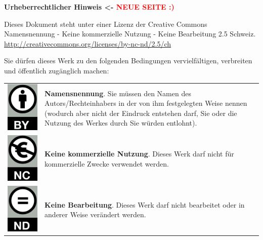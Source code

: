 \documentclass[11pt, twoside, a4paper]{book}		%
\begin{document}
\begin{titlepage}
	\clearpage
	\pagestyle{empty}
	\centering
	
	\textbf{Urheberrechtlicher Hinweis <- \textcolor{red}{NEUE SEITE :)}}

	\hspace{1cm}

	Dieses Dokument steht unter einer Lizenz der Creative Commons Namensnennung - Keine kommerzielle Nutzung - Keine Bearbeitung 2.5 Schweiz.\\ \url{http://creativecommons.org/licenses/by-nc-nd/2.5/ch}
	
	\hspace{1cm}

	\RaggedRight Sie dürfen dieses Werk zu den folgenden Bedingungen vervielfältigen, verbreiten und öffentlich zugänglich machen:

	\begin{table}[h]
		\centering
		\small
		\begin{tabular}{c m{}}
			\raisebox{-.47\height} 	{\includegraphics[width=.1\textwidth]{png/CC_by_me}}
			&
			\textbf{Namensnennung}. Sie müssen den Namen des Autors/Rechteinhabers in der von ihm festgelegten Weise nennen (wodurch aber nicht der Eindruck entstehen darf, Sie oder die Nutzung des Werkes durch Sie würden entlohnt). \\
			\rule{0pt}{9ex}%
			\raisebox{-.5\height} {\includegraphics[width=.1\textwidth]{png/CC_nc_me}}
			&
			\textbf{Keine kommerzielle Nutzung}. Dieses Werk darf nicht für kommerzielle Zwecke verwendet werden. \\
			\rule{0pt}{9ex}%
			\raisebox{-.5\height} {\includegraphics[width=.1\textwidth]{png/CC_nd_me}}
			&
			\textbf{Keine Bearbeitung}. Dieses Werk darf nicht bearbeitet oder in anderer Weise verändert werden. \\
		\end{tabular}
	\end{table}
	

\end{titlepage}
\end{document}
